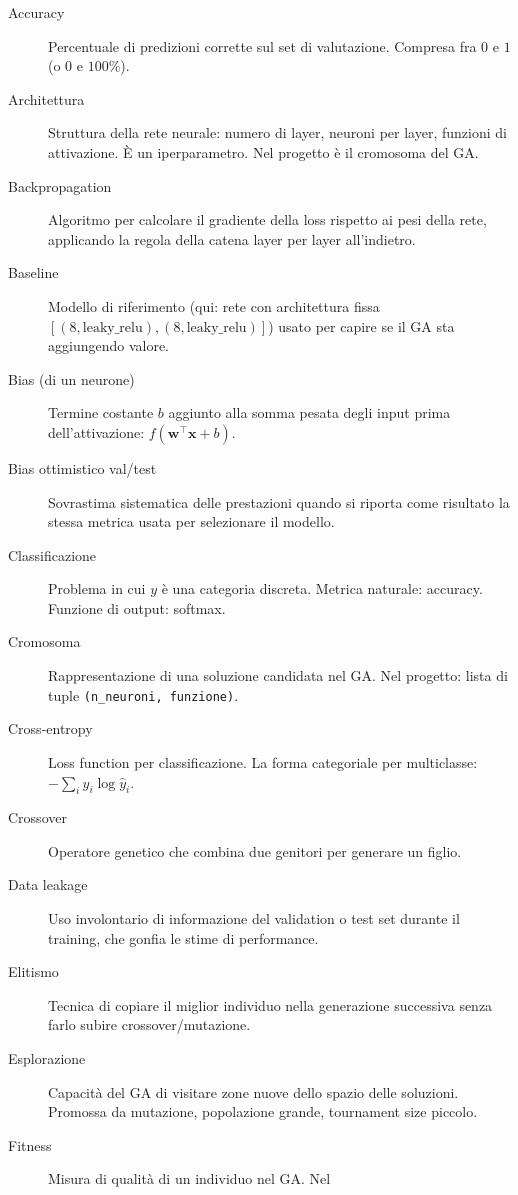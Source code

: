 \documentclass[11pt,a4paper]{article}
\begin{document}
\begin{description}
    \item[Accuracy] Percentuale di predizioni corrette sul set di
        valutazione. Compresa fra $0$ e $1$ (o $0$ e $100\%$).
    \item[Architettura] Struttura della rete neurale: numero di layer,
        neuroni per layer, funzioni di attivazione. È un iperparametro.
        Nel progetto è il cromosoma del GA.
    \item[Backpropagation] Algoritmo per calcolare il gradiente della
        loss rispetto ai pesi della rete, applicando la regola della
        catena layer per layer all'indietro.
    \item[Baseline] Modello di riferimento (qui: rete con architettura
        fissa $[(8,\text{leaky\_relu}),(8,\text{leaky\_relu})]$) usato per
        capire se il GA sta aggiungendo valore.
    \item[Bias (di un neurone)] Termine costante $b$ aggiunto alla somma
        pesata degli input prima dell'attivazione: $f(\bm{w}^\top \bm{x} + b)$.
    \item[Bias ottimistico val/test] Sovrastima sistematica delle
        prestazioni quando si riporta come risultato la stessa metrica
        usata per selezionare il modello.
    \item[Classificazione] Problema in cui $y$ è una categoria discreta.
        Metrica naturale: accuracy. Funzione di output: softmax.
    \item[Cromosoma] Rappresentazione di una soluzione candidata nel GA.
        Nel progetto: lista di tuple \texttt{(n\_neuroni, funzione)}.
    \item[Cross-entropy] Loss function per classificazione. La forma
        categoriale per multiclasse: $-\sum_i y_i \log \hat{y}_i$.
    \item[Crossover] Operatore genetico che combina due genitori per
        generare un figlio.
    \item[Data leakage] Uso involontario di informazione del validation
        o test set durante il training, che gonfia le stime di
        performance.
    \item[Elitismo] Tecnica di copiare il miglior individuo nella
        generazione successiva senza farlo subire crossover/mutazione.
    \item[Esplorazione] Capacità del GA di visitare zone nuove dello
        spazio delle soluzioni. Promossa da mutazione, popolazione
        grande, tournament size piccolo.
    \item[Fitness] Misura di qualità di un individuo nel GA. Nel

\end{description}
\end{document}
